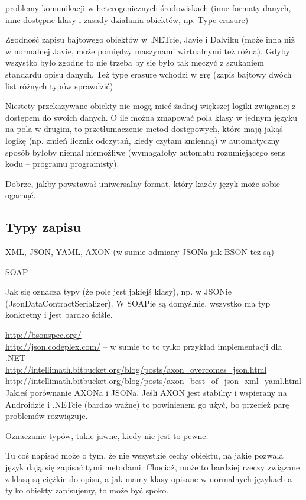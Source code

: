 problemy komunikacji w heterogenicznych środowiskach (inne formaty danych, inne dostępne klasy i zasady działania obiektów, np. Type erasure)

Zgodność zapisu bajtowego obiektów w .NETcie, Javie i Dalviku (może inna niż w normalnej Javie, może pomiędzy maszynami wirtualnymi też różna). Gdyby wszystko było zgodne to nie trzeba by się było tak męczyć z szukaniem standardu opisu danych. Też type erasure wchodzi w grę (zapis bajtowy dwóch list różnych typów sprawdzić)

Niestety przekazywane obiekty nie mogą mieć żadnej większej logiki związanej z dostępem do swoich danych. O ile można zmapować pola klasy w jednym języku na pola w drugim, to przetłumaczenie metod dostępowych, które mają jakąś logikę (np. zmień licznik odczytań, kiedy czytam zmienną) w automatyczny sposób byłoby niemal niemożliwe (wymagałoby automatu rozumiejącego sens kodu -- programu programisty).

Dobrze, jakby powstawał uniwersalny format, który każdy język może sobie ogarnąć.

\subsection{Typy zapisu}
XML, JSON, YAML, AXON (w sumie odmiany JSONa jak BSON też są)

SOAP 

Jak się oznacza typy (że pole jest jakiejś klasy), np. w JSONie (JsonDataContractSerializer). W SOAPie są domyślnie, wszystko ma typ konkretny i jest bardzo ściśle.

\url{http://bsonspec.org/}\\
\url{http://json.codeplex.com/} -- w sumie to to tylko przykład implementacji dla .NET\\

\url{http://intellimath.bitbucket.org/blog/posts/axon_overcomes_json.html}\\
\url{http://intellimath.bitbucket.org/blog/posts/axon_best_of_json_xml_yaml.html}\\
Jakieś porównanie AXONa i JSONa. Jeśli AXON jest stabilny i wspierany na Androidzie i .NETcie (bardzo ważne) to powinienem go użyć, bo przecież parę problemów rozwiązuje.

Oznaczanie typów, takie jawne, kiedy nie jest to pewne.

Tu coś napisać może o tym, że nie wszystkie cechy obiektu, na jakie pozwala język dają się zapisać tymi metodami. Chociaż, może to bardziej rzeczy związane z klasą są ciężkie do opisu, a jak mamy klasy opisane w normalnych językach a tylko obiekty zapisujemy, to może być spoko.

